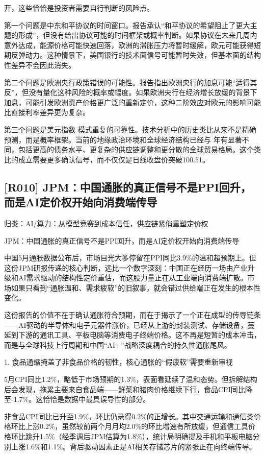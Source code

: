 \documentclass[11pt]{ctexart}
\begin{document}
开，这些恰恰是投资者需要自行判断的风险点。

第一个问题是中东和平协议的时间窗口。报告承认“和平协议的希望阻止了更大主题的形成”，但没有给出协议可能的时间框架或概率判断。如果协议在未来几周内意外达成，能源价格可能快速回落，欧洲的滞胀压力将暂时缓解，欧元可能获得短期反弹动力。这种情景下，美国银行的技术面信号可能暂时失效，但基本面的结构性差异不会因此消失。

第二个问题是欧洲央行政策错误的可能性。报告指出欧洲央行的加息可能“适得其反”，但没有量化这种风险的概率或幅度。如果欧洲央行在经济增长放缓的背景下加息，可能引发欧洲资产价格更广泛的重新定价，这种二阶效应对欧元的影响可能比直接利率差异更为复杂。

第三个问题是美元指数 模式重复的可靠性。技术分析中的历史类比从来不是精确预测，而是概率框架。当前的地缘政治环境和全球经济结构已经与 年有显著不同，包括更高的债务水平、更复杂的供应链调整和更分散的全球贸易格局。这个类比的成立需要更多确认信号，而不仅仅是日线收盘价突破100.51。

\subsection{[R010] JPM：中国通胀的真正信号不是PPI回升，而是AI定价权开始向消费端传导}
{\small\color{refgray}归类：AI/算力：从模型竞赛到成本信任，供应链紧俏重塑定价权}

JPM：中国通胀的真正信号不是PPI回升，而是AI定价权开始向消费端传导

中国5月通胀数据公布后，市场目光大多停留在PPI同比3.9\%的温和超预期上。但这份JPM研报传递的核心判断，远比一个数字深刻：中国正在经历一场由产业升级和AI需求驱动的结构性定价重估，而这股力量正在从工业端向消费端扩散。市场如果只看到“通胀温和、需求疲软”的旧叙事，就会错过供给端正在发生的根本性变化。

这份报告的价值不在于确认通胀符合预期，而在于揭示了一个正在成型的传导链条——AI驱动的半导体和电子元器件涨价，已经从上游的封装测试、存储设备，蔓延到下游的通讯工具、平板电脑等消费电子终端价格。这不再是短暂的成本冲击，而是与全球科技上行周期和中国“AI+”战略深度耦合的持久性通胀尾风。

1. 食品通缩掩盖了非食品价格的韧性，核心通胀的“假疲软”需要重新审视

5月CPI同比1.2\%，略低于市场预期的1.3\%，表面看延续了温和态势。但拆解结构后会发现，拖累主要来自食品端——鲜菜和猪肉价格继续下行，食品CPI同比降至-1.7\%。这恰恰是数据中最具误导性的部分。

非食品CPI同比已升至1.9\%，环比仍录得0.2\%的正增长。其中交通运输和通信类价格环比上涨0.2\%，虽然较前两个月月均2.0\%的环比增速有所放缓，但通信工具价格环比跳升1.5\%（经季调后JPM估算为1.8\%），统计局明确提及手机和平板电脑分别上涨1.6\%和1.1\%。背后驱动因素正是AI相关存储芯片的紧张正在向终端传导。
\end{document}
